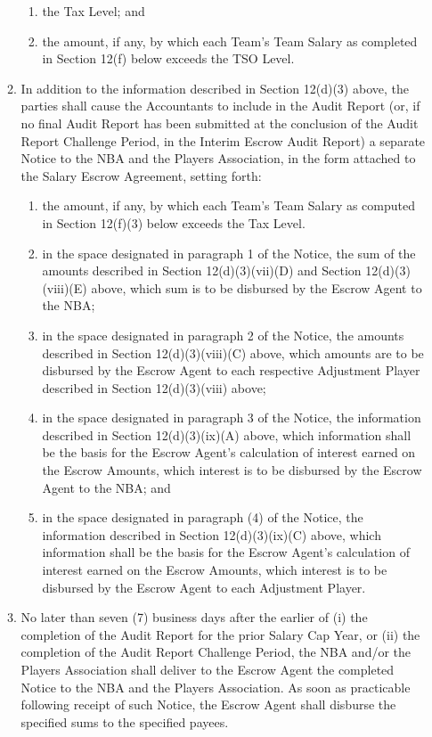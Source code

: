 \documentclass[
]{book}
\providecommand{\tightlist}{%
  \setlength{\itemsep}{0pt}\setlength{\parskip}{0pt}}
\begin{document}
\begin{enumerate}
\begin{enumerate}
\begin{enumerate}
    \item
      the Tax Level; and
    \item
      the amount, if any, by which each Team's Team Salary as completed in Section 12(f) below exceeds the TSO Level.
    \end{enumerate}
  \item
    In addition to the information described in Section 12(d)(3) above, the parties shall cause the Accountants to include in the Audit Report (or, if no final Audit Report has been submitted at the conclusion of the Audit Report Challenge Period, in the Interim Escrow Audit Report) a separate Notice to the NBA and the Players Association, in the form attached to the Salary Escrow Agreement, setting forth:

    \begin{enumerate}
    \def\labelenumiii{(\roman{enumiii})}
    \tightlist
    \item
      the amount, if any, by which each Team's Team Salary as computed in Section 12(f)(3) below exceeds the Tax Level.
    \item
      in the space designated in paragraph 1 of the Notice, the sum of the amounts described in Section 12(d)(3)(vii)(D) and Section 12(d)(3)(viii)(E) above, which sum is to be disbursed by the Escrow Agent to the NBA;
    \item
      in the space designated in paragraph 2 of the Notice, the amounts described in Section 12(d)(3)(viii)(C) above, which amounts are to be disbursed by the Escrow Agent to each respective Adjustment Player described in Section 12(d)(3)(viii) above;
    \item
      in the space designated in paragraph 3 of the Notice, the information described in Section 12(d)(3)(ix)(A) above, which information shall be the basis for the Escrow Agent's calculation of interest earned on the Escrow Amounts, which interest is to be disbursed by the Escrow Agent to the NBA; and
    \item
      in the space designated in paragraph (4) of the Notice, the information described in Section 12(d)(3)(ix)(C) above, which information shall be the basis for the Escrow Agent's calculation of interest earned on the Escrow Amounts, which interest is to be disbursed by the Escrow Agent to each Adjustment Player.
    \end{enumerate}
  \item
    No later than seven (7) business days after the earlier of (i) the completion of the Audit Report for the prior Salary Cap Year, or (ii) the completion of the Audit Report Challenge Period, the NBA and/or the Players Association shall deliver to the Escrow Agent the completed Notice to the NBA and the Players Association. As soon as practicable following receipt of such Notice, the Escrow Agent shall disburse the specified sums to the specified payees.

\end{enumerate}
\end{enumerate}
\end{document}
